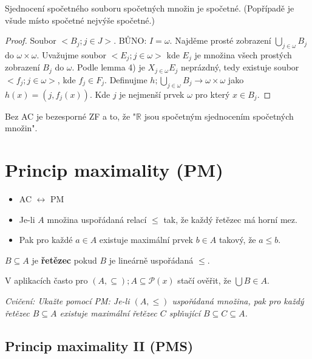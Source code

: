 \begin{lemma}
	Sjednocení spočetného souboru spočetných množin je spočetné. (Popřípadě je všude místo spočetné nejvýše spočetné.)
\end{lemma}

\begin{proof}
	Soubor $<B_{j};j \in J>$. BŮNO: $I = \omega$. Najděme prosté zobrazení $\bigcup_{j \in \omega} B_{j}$ do $\omega \times \omega$. Uvažujme soubor $<E_{j}; j \in \omega>$ kde $E_{j}$ je množina všech prostých zobrazení $B_{j}$ do $\omega$. Podle lemma 4) je $X_{j \in \omega}E_{j}$ neprázdný, tedy existuje soubor $<f_{j}; j \in \omega>$, kde $f_{j} \in F_{j}$. Definujme $h; \bigcup_{j \in \omega}B_{j} \to \omega\times\omega$ jako $h(x) = (j, f_{j}(x))$. Kde $j$ je nejmenší prvek $\omega$ pro který $x \in B_{j}$.
\end{proof}

\begin{pozn}
	Bez AC je bezesporné ZF a to, že "$\mathbb{R}$ jsou spočetným sjednocením spočetných množin".
\end{pozn}

\section{Princip maximality (PM)}

\begin{itemize}
	\item AC $\leftrightarrow$ PM
	\item Je-li $A$ množina uspořádaná relací $\leq$ tak, že každý řetězec má horní mez.
	\item Pak pro každé $a \in A$ existuje maximální prvek $b \in A$ takový, že $a \leq b$.
\end{itemize}

\begin{definice}
	$B \subseteq A$ je \textbf{řetězec} pokud $B$ je lineárně uspořádaná $\leq$.
\end{definice}

\begin{pozn}
	V aplikacích často pro $(A, \subseteq); A \subseteq \mathcal{P}(x)$ stačí ověřit, že $\bigcup B \in A$.
\end{pozn}

\textit{Cvičení: Ukažte pomocí PM: Je-li $(A, \leq)$ uspořádaná množina, pak pro každý řetězec $B \subseteq A$ existuje maximální řetězec $C$ splňující $B \subseteq C \subseteq A$.}

\subsection{Princip maximality II (PMS)}

